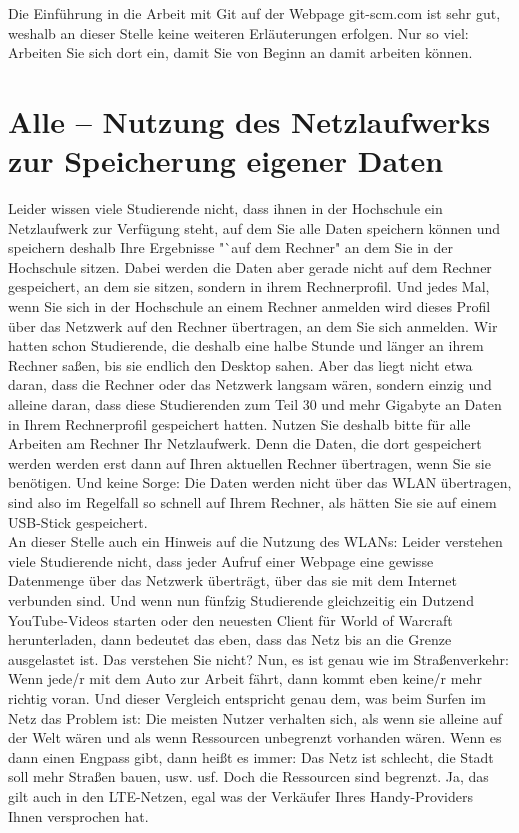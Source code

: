 Die Einführung in die Arbeit mit Git auf der Webpage git-scm.com ist sehr gut, weshalb an dieser Stelle keine weiteren Erläuterungen erfolgen. Nur so viel: Arbeiten Sie sich dort ein, damit Sie von Beginn an damit arbeiten können.

\section{Alle – Nutzung des Netzlaufwerks zur Speicherung eigener Daten}

Leider wissen viele Studierende nicht, dass ihnen in der Hochschule ein Netzlaufwerk zur Verfügung steht, auf dem Sie alle Daten speichern können und speichern deshalb Ihre Ergebnisse "`auf dem Rechner" an dem Sie in der Hochschule sitzen. Dabei werden die Daten aber gerade nicht auf dem Rechner gespeichert, an dem sie sitzen, sondern in ihrem Rechnerprofil. Und jedes Mal, wenn Sie sich in der Hochschule an einem Rechner anmelden wird dieses Profil über das Netzwerk auf den Rechner übertragen, an dem Sie sich anmelden. Wir hatten schon Studierende, die deshalb eine halbe Stunde und länger an ihrem Rechner saßen, bis sie endlich den Desktop sahen. Aber das liegt nicht etwa daran, dass die Rechner oder das Netzwerk langsam wären, sondern einzig und alleine daran, dass diese Studierenden zum Teil 30 und mehr Gigabyte an Daten in Ihrem Rechnerprofil gespeichert hatten. Nutzen Sie deshalb bitte für alle Arbeiten am Rechner Ihr Netzlaufwerk. Denn die Daten, die dort gespeichert werden werden erst dann auf Ihren aktuellen Rechner übertragen, wenn Sie sie benötigen. Und keine Sorge: Die Daten werden nicht über das WLAN übertragen, sind also im Regelfall so schnell auf Ihrem Rechner, als hätten Sie sie auf einem USB-Stick gespeichert.\\

An dieser Stelle auch ein Hinweis auf die Nutzung des WLANs: Leider verstehen viele Studierende nicht, dass jeder Aufruf einer Webpage eine gewisse Datenmenge über das Netzwerk überträgt, über das sie mit dem Internet verbunden sind. Und wenn nun fünfzig Studierende gleichzeitig ein Dutzend YouTube-Videos starten oder den neuesten Client für World of Warcraft herunterladen, dann bedeutet das eben, dass das Netz bis an die Grenze ausgelastet ist. Das verstehen Sie nicht? Nun, es ist genau wie im Straßenverkehr: Wenn jede/r mit dem Auto zur Arbeit fährt, dann kommt eben keine/r mehr richtig voran. Und dieser Vergleich entspricht genau dem, was beim Surfen im Netz das Problem ist: Die meisten Nutzer verhalten sich, als wenn sie alleine auf der Welt wären und als wenn Ressourcen unbegrenzt vorhanden wären. Wenn es dann einen Engpass gibt, dann heißt es immer: Das Netz ist schlecht, die Stadt soll mehr Straßen bauen, usw. usf. Doch die Ressourcen sind begrenzt. Ja, das gilt auch in den LTE-Netzen, egal was der Verkäufer Ihres Handy-Providers Ihnen versprochen hat.

